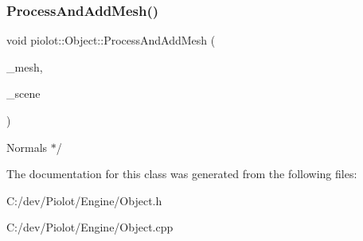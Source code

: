 \subsubsection{\texorpdfstring{Process\+And\+Add\+Mesh()}{ProcessAndAddMesh()}}
{\footnotesize\ttfamily void piolot\+::\+Object\+::\+Process\+And\+Add\+Mesh (\begin{DoxyParamCaption}\item[{ai\+Mesh $\ast$}]{\+\_\+mesh,  }\item[{const ai\+Scene $\ast$}]{\+\_\+scene }\end{DoxyParamCaption})\hspace{0.3cm}{\ttfamily [private]}}


\begin{DoxyItemize}
\item Normals $\ast$/ 
\end{DoxyItemize}

The documentation for this class was generated from the following files\+:\begin{DoxyCompactItemize}
\item 
C\+:/dev/\+Piolot/\+Engine/Object.\+h\item 
C\+:/dev/\+Piolot/\+Engine/Object.\+cpp\end{DoxyCompactItemize}
